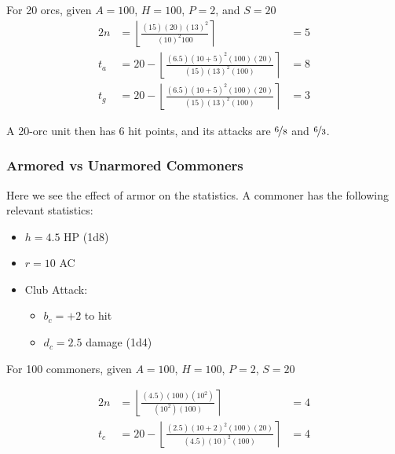 \documentclass[twocolumn]{article}
\begin{document}
For 20 orcs, given $A = 100$, $H = 100$, $P = 2$, and $S = 20$
\begin{alignat*}{2}
    n   &=  
        \left\lfloor
            \frac
                {(15) (20) (13)^2}
                {(10)^2 100}
        \right\rceil
            &=  5
    \\
    t_a &=
        20 -
        \left\lfloor
            \frac
                {(6.5) (10 + 5)^2 (100) (20)}
                {(15) (13)^2 (100)}
        \right\rceil
            &=   8
    \\
    t_g &=  
        20 -
        \left\lfloor
            \frac
                {(6.5) (10 + 5)^2 (100) (20)}
                {(15) (13)^2 (100)}
        \right\rceil
            &=  3
\end{alignat*}

A 20-orc unit then has 6 hit points, and its attacks are
$\nicefrac{6}{8}$ and $\nicefrac{6}{3}$.

\subsubsection{Armored vs Unarmored Commoners}

Here we see the effect of armor on the statistics.
A commoner has the following relevant statistics:

\begin{itemize}
    \item $h = 4.5$ HP (1d8)
    \item $r = 10$ AC
    \item Club Attack:
        \begin{itemize}
            \item $b_c = +2$ to hit
            \item $d_c = 2.5$ damage (1d4)
        \end{itemize}
\end{itemize}


For 100 commoners, given $A = 100$, $H = 100$, $P = 2$, $S = 20$

\begin{alignat*}{2}
    n   &=  
        \left\lfloor
            \frac
                {(4.5) (100) (10^2)}
                {(10^2) (100)}
        \right\rceil
            &= 4
    \\
    t_c &=
        20 -
        \left\lfloor
            \frac
                {(2.5) (10 + 2)^2 (100) (20)}
                {(4.5) (10)^2 (100)}
        \right\rceil
            &= 4
\end{alignat*}
\end{document}
